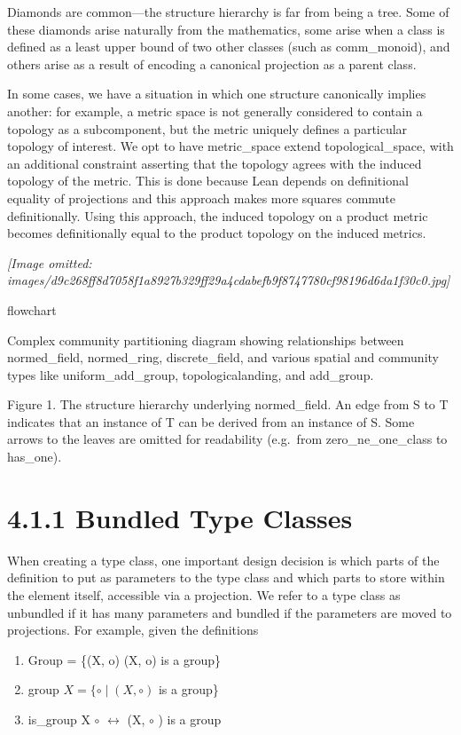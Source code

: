 \documentclass[
]{article}
\providecommand{\tightlist}{%
  \setlength{\itemsep}{0pt}\setlength{\parskip}{0pt}}
\begin{document}
Diamonds are common---the structure hierarchy is far from being a tree.
Some of these diamonds arise naturally from the mathematics, some arise
when a class is defined as a least upper bound of two other classes
(such as comm\_monoid), and others arise as a result of encoding a
canonical projection as a parent class.

In some cases, we have a situation in which one structure canonically
implies another: for example, a metric space is not generally considered
to contain a topology as a subcomponent, but the metric uniquely defines
a particular topology of interest. We opt to have metric\_space extend
topological\_space, with an additional constraint asserting that the
topology agrees with the induced topology of the metric. This is done
because Lean depends on definitional equality of projections and this
approach makes more squares commute definitionally. Using this approach,
the induced topology on a product metric becomes definitionally equal to
the product topology on the induced metrics.

\textit{[Image omitted: images/d9c268ff8d7058f1a8927b329ff29a4cdabefb9f8747780cf98196d6da1f30c0.jpg]}

flowchart

Complex community partitioning diagram showing relationships between
normed\_field, normed\_ring, discrete\_field, and various spatial and
community types like uniform\_add\_group, topologicalanding, and
add\_group.

Figure 1. The structure hierarchy underlying normed\_field. An edge from
S to T indicates that an instance of T can be derived from an instance
of S. Some arrows to the leaves are omitted for readability (e.g.~from
zero\_ne\_one\_class to has\_one).

\section{4.1.1 Bundled Type Classes}\label{bundled-type-classes}

When creating a type class, one important design decision is which parts
of the definition to put as parameters to the type class and which parts
to store within the element itself, accessible via a projection. We
refer to a type class as unbundled if it has many parameters and bundled
if the parameters are moved to projections. For example, given the
definitions

\begin{enumerate}
\def\labelenumi{\arabic{enumi}.}
\tightlist
\item
  Group = \{(X, o) \textbar{} (X, o) is a group\}\\
\item
  group \(X = \{\circ \mid (X,\circ)\) is a group\}\\
\item
  is\_group X \(\circ\) \(\leftrightarrow\) (X, \(\circ\) ) is a group
\end{enumerate}
\end{document}
